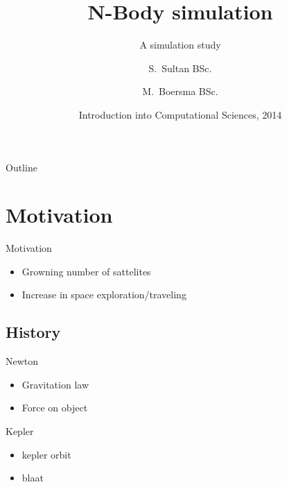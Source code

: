 \documentclass{beamer}
\title[] %
{N-Body simulation}
\subtitle
{A simulation study}
\author[S. Sultan, M. Boersma] %
{S.~Sultan\inst{1} BSc. \and M.~Boersma\inst{1} BSc.}
\institute[Universities of Amsterdam] %
{
  \inst{1}%
  Department of Computational Science\\
  University of Amsterdam
 }
\date[CFP 2003] %
{Introduction into Computational Sciences, 2014}
\begin{document}
\begin{frame}
  \titlepage
\end{frame}

\begin{frame}{Outline}
  \tableofcontents
\end{frame}





\section{Motivation}

\begin{frame}{Motivation}
	\begin{itemize}
		\item
			Growning number of sattelites 
		\item
			Increase in space exploration/traveling
	\end{itemize}
\end{frame}


\subsection{History}

\begin{frame}{Newton}
	\begin{itemize}
		\item
			Gravitation law
		\item 
			Force on object
	\end{itemize}
\end{frame}

\begin{frame}{Kepler}
	\begin{itemize}
		\item 
			kepler orbit
		\item
			blaat
	\end{itemize}
\end{frame}
\end{document}
